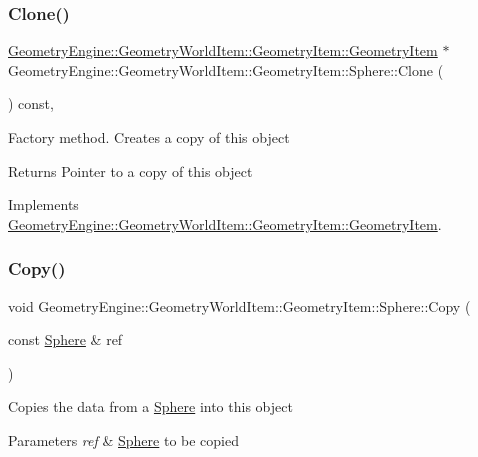 \subsubsection{\texorpdfstring{Clone()}{Clone()}}
{\footnotesize\ttfamily \mbox{\hyperlink{class_geometry_engine_1_1_geometry_world_item_1_1_geometry_item_1_1_geometry_item}{Geometry\+Engine\+::\+Geometry\+World\+Item\+::\+Geometry\+Item\+::\+Geometry\+Item}} $\ast$ Geometry\+Engine\+::\+Geometry\+World\+Item\+::\+Geometry\+Item\+::\+Sphere\+::\+Clone (\begin{DoxyParamCaption}{ }\end{DoxyParamCaption}) const\hspace{0.3cm}{\ttfamily [override]}, {\ttfamily [virtual]}}

Factory method. Creates a copy of this object \begin{DoxyReturn}{Returns}
Pointer to a copy of this object 
\end{DoxyReturn}


Implements \mbox{\hyperlink{class_geometry_engine_1_1_geometry_world_item_1_1_geometry_item_1_1_geometry_item_a1db8f97339ba49f746b3e0b4c4b02748}{Geometry\+Engine\+::\+Geometry\+World\+Item\+::\+Geometry\+Item\+::\+Geometry\+Item}}.

\mbox{\label{class_geometry_engine_1_1_geometry_world_item_1_1_geometry_item_1_1_sphere_a2124223c5454a1759f25ffad90157e06}} 
\subsubsection{\texorpdfstring{Copy()}{Copy()}}
{\footnotesize\ttfamily void Geometry\+Engine\+::\+Geometry\+World\+Item\+::\+Geometry\+Item\+::\+Sphere\+::\+Copy (\begin{DoxyParamCaption}\item[{const \mbox{\hyperlink{class_geometry_engine_1_1_geometry_world_item_1_1_geometry_item_1_1_sphere}{Sphere}} \&}]{ref }\end{DoxyParamCaption})\hspace{0.3cm}{\ttfamily [virtual]}}

Copies the data from a \mbox{\hyperlink{class_geometry_engine_1_1_geometry_world_item_1_1_geometry_item_1_1_sphere}{Sphere}} into this object 
\begin{DoxyParams}{Parameters}
{\em ref} & \mbox{\hyperlink{class_geometry_engine_1_1_geometry_world_item_1_1_geometry_item_1_1_sphere}{Sphere}} to be copied \\
\hline
\end{DoxyParams}


